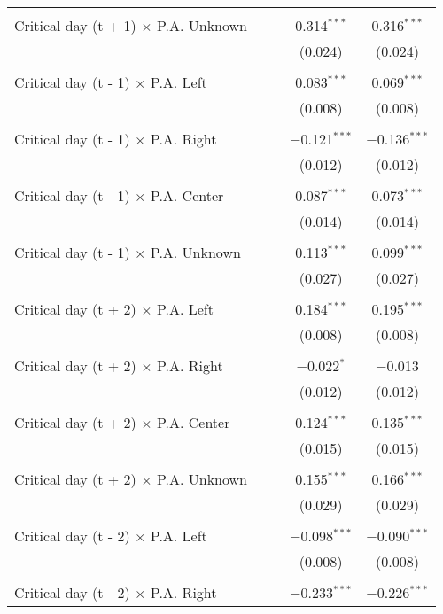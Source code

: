 \documentclass[
]{article}
\begin{document}
\begin{table}[!htbp]
{\begin{tabular}{@{\extracolsep{5pt}}lcccc}
  & & & & \\ 
 Critical day (t + 1) $\times$ P.A. Unknown &  &  & 0.314$^{***}$ & 0.316$^{***}$ \\ 
  &  &  & (0.024) & (0.024) \\ 
  & & & & \\ 
 Critical day (t - 1) $\times$ P.A. Left &  &  & 0.083$^{***}$ & 0.069$^{***}$ \\ 
  &  &  & (0.008) & (0.008) \\ 
  & & & & \\ 
 Critical day (t - 1) $\times$ P.A. Right &  &  & $-$0.121$^{***}$ & $-$0.136$^{***}$ \\ 
  &  &  & (0.012) & (0.012) \\ 
  & & & & \\ 
 Critical day (t - 1) $\times$ P.A. Center &  &  & 0.087$^{***}$ & 0.073$^{***}$ \\ 
  &  &  & (0.014) & (0.014) \\ 
  & & & & \\ 
 Critical day (t - 1) $\times$ P.A. Unknown &  &  & 0.113$^{***}$ & 0.099$^{***}$ \\ 
  &  &  & (0.027) & (0.027) \\ 
  & & & & \\ 
 Critical day (t + 2) $\times$ P.A. Left &  &  & 0.184$^{***}$ & 0.195$^{***}$ \\ 
  &  &  & (0.008) & (0.008) \\ 
  & & & & \\ 
 Critical day (t + 2) $\times$ P.A. Right &  &  & $-$0.022$^{*}$ & $-$0.013 \\ 
  &  &  & (0.012) & (0.012) \\ 
  & & & & \\ 
 Critical day (t + 2) $\times$ P.A. Center &  &  & 0.124$^{***}$ & 0.135$^{***}$ \\ 
  &  &  & (0.015) & (0.015) \\ 
  & & & & \\ 
 Critical day (t + 2) $\times$ P.A. Unknown &  &  & 0.155$^{***}$ & 0.166$^{***}$ \\ 
  &  &  & (0.029) & (0.029) \\ 
  & & & & \\ 
 Critical day (t - 2) $\times$ P.A. Left &  &  & $-$0.098$^{***}$ & $-$0.090$^{***}$ \\ 
  &  &  & (0.008) & (0.008) \\ 
  & & & & \\ 
 Critical day (t - 2) $\times$ P.A. Right &  &  & $-$0.233$^{***}$ & $-$0.226$^{***}$ \\ 

\end{tabular}}
\end{table}
\end{document}
